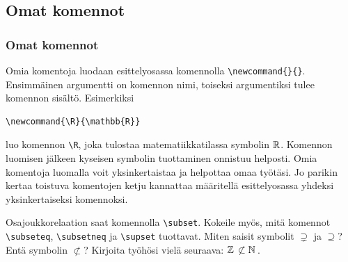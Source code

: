 \subsection{Omat komennot}
\begin{frame}[fragile]
    \frametitle{Omat komennot}
    Omia komentoja luodaan esittelyosassa komennolla \verb-\newcommand{}{}-. Ensimmäinen argumentti on komennon nimi, toiseksi argumentiksi tulee komennon sisältö. Esimerkiksi
    \begin{Verbatim}[frame=single]
\newcommand{\R}{\mathbb{R}}
    \end{Verbatim}
    luo komennon \verb-\R-, joka tulostaa matematiikkatilassa symbolin \(\R\). Komennon luomisen jälkeen kyseisen symbolin tuottaminen onnistuu helposti.
    \vaihto
    Omia komentoja luomalla voit yksinkertaistaa ja helpottaa omaa työtäsi. Jo parikin kertaa toistuva komentojen ketju kannattaa määritellä esittelyosassa yhdeksi yksinkertaiseksi komennoksi.
\end{frame}
\begin{frame}[fragile]
    
    Osajoukkorelaation saat komennolla \verb-\subset-. Kokeile myös, mitä komennot \verb-\subseteq-, \verb-\subsetneq- ja  \verb-\supset- tuottavat. Miten saisit symbolit \(\supsetneq\) ja  \(\supseteq\)? Entä symbolin \(\not\subset\)? Kirjoita työhösi vielä seuraava: \(\mathbb{Z}\,\not\subset\mathbb{N}\,\).
\end{frame}

